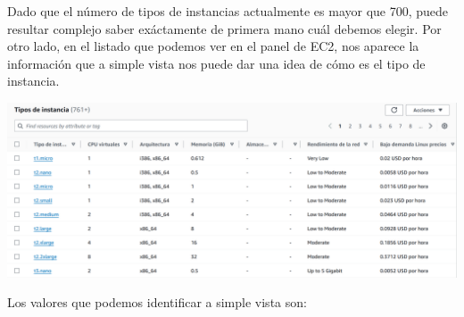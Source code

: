Dado que el número de tipos de instancias actualmente es mayor que 700, puede resultar complejo saber exáctamente de primera mano cuál debemos elegir. Por otro lado, en el listado que podemos ver en el panel de EC2, nos aparece la información que a simple vista nos puede dar una idea de cómo es el tipo de instancia.


\begin{center}
	\includegraphics[frame,width=0.9\linewidth]{img/aws/ec2_instance_types.png}
\end{center}

Los valores que podemos identificar a simple vista son:

